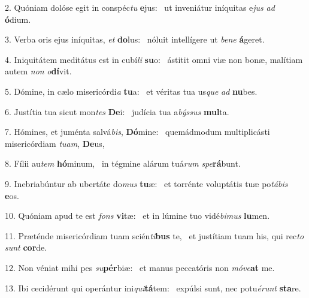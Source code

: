 2. Quóniam dolóse egit in conspéc\textit{tu} \textbf{e}jus: \ast\  ut inveniátur iníquitas e\textit{jus} \textit{ad} \textbf{ó}dium.\

3. Verba oris ejus iníquitas, \textit{et} \textbf{do}lus: \ast\  nóluit intellígere ut \textit{be}\textit{ne} \textbf{á}geret.\

4. Iniquitátem meditátus est in cubí\textit{li} \textbf{su}o: \ast\  ástitit omni viæ non bonæ, malítiam autem \textit{non} \textit{o}\textbf{dí}vit.\

5. Dómine, in cælo misericórdi\textit{a} \textbf{tu}a: \ast\  et véritas tua us\textit{que} \textit{ad} \textbf{nu}bes.\

6. Justítia tua sicut mon\textit{tes} \textbf{De}i: \ast\  judícia tua a\textit{býs}\textit{sus} \textbf{mul}ta.\

7. Hómines, et juménta salvá\textit{bis}, \textbf{Dó}mine: \ast\  quemádmodum multiplicásti misericórdiam \textit{tu}\textit{am}, \textbf{De}us,\

8. Fílii au\textit{tem} \textbf{hó}minum, \ast\  in tégmine alárum tuá\textit{rum} \textit{spe}\textbf{rá}bunt.\

9. Inebriabúntur ab ubertáte do\textit{mus} \textbf{tu}æ: \ast\  et torrénte voluptátis tuæ po\textit{tá}\textit{bis} \textbf{e}os.\

10. Quóniam apud te est \textit{fons} \textbf{vi}tæ: \ast\  et in lúmine tuo vidé\textit{bi}\textit{mus} \textbf{lu}men.\

11. Præténde misericórdiam tuam scién\textit{ti}\textbf{bus} te, \ast\  et justítiam tuam his, qui rec\textit{to} \textit{sunt} \textbf{cor}de.\

12. Non véniat mihi pes \textit{su}\textbf{pér}biæ: \ast\  et manus peccatóris non \textit{mó}\textit{ve}\textbf{at} me.\

13. Ibi cecidérunt qui operántur ini\textit{qui}\textbf{tá}tem: \ast\  expúlsi sunt, nec potu\textit{é}\textit{runt} \textbf{sta}re.\

